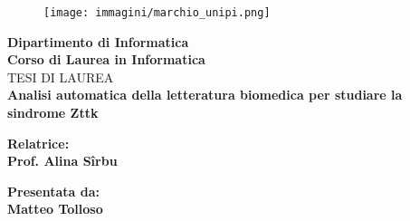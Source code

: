 \begin{titlepage} %
    \begin{figure}[t] %
        \centering\texttt{[image: immagini/marchio\_unipi.png]}
    \end{figure}
    
    
    \begin{Large}
     \begin{center}
        \textbf{Dipartimento di Informatica\\ Corso di Laurea in Informatica\\}
        \vspace{10mm}
        {\LARGE{TESI DI LAUREA}}\\
        \vspace{5mm}
        {\huge{\bf Analisi automatica della letteratura biomedica per studiare la sindrome Zttk}}\\
    \end{center}
    \end{Large}
    
    \vspace{30mm}
    \begin{minipage}[t]{0.47\textwidth}
        {\large{\bf Relatrice:\\ Prof. Alina Sîrbu}}
    \end{minipage}
    \hfill
    \begin{minipage}[t]{0.47\textwidth}\raggedleft
        {\large{\bf Presentata da: \\ Matteo Tolloso}}
    \end{minipage}
    
    \vspace{10mm}
    
    \hrulefill
    
    \vspace{5mm}
    
    
    \end{titlepage}
    